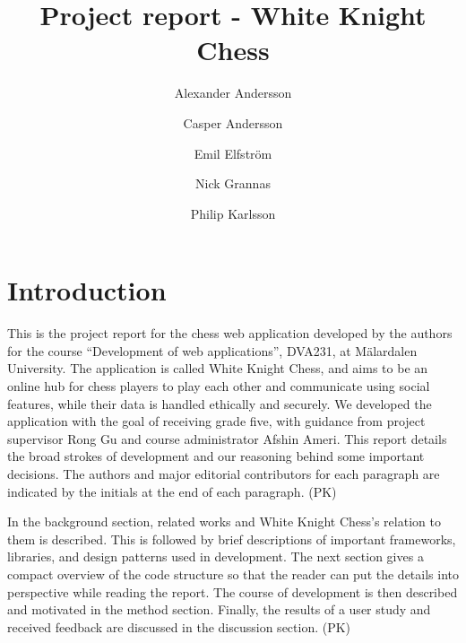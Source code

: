 \documentclass[acmlarge, review=false, screen=true]{acmart}
\begin{document}
\title{Project report - White Knight Chess}

\author{Alexander Andersson}
\author{Casper Andersson}
\author{Emil Elfström}
\author{Nick Grannas}
\author{Philip Karlsson}




\maketitle

\section{Introduction}
This is the project report for the chess web application developed by the authors for the course “Development of web applications”, DVA231, at Mälardalen University. The application is called White Knight Chess, and aims to be an online hub for chess players to play each other and communicate using social features, while their data is handled ethically and securely. We developed the application with the goal of receiving grade five, with guidance from project supervisor Rong Gu and course administrator Afshin Ameri. This report details the broad strokes of development and our reasoning behind some important decisions. The authors and major editorial contributors for each paragraph are indicated by the initials at the end of each paragraph. (PK)

In the background section, related works and White Knight Chess's relation to them is described. This is followed by brief descriptions of important frameworks, libraries, and design patterns used in development. The next section gives a compact overview of the code structure so that the reader can put the details into perspective while reading the report. The course of development is then described and motivated in the method section. Finally, the results of a user study and received feedback are discussed in the discussion section. (PK)
\end{document}
